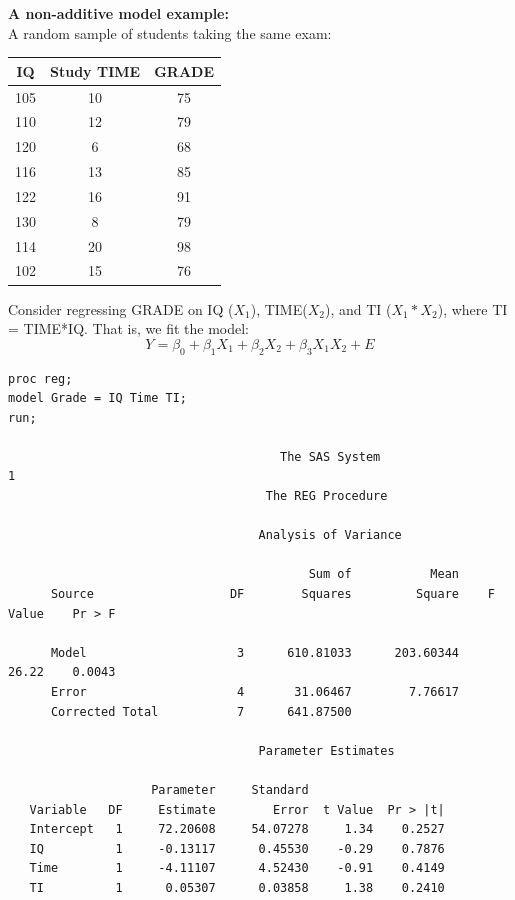 \begin{center}
\end{center}

\newpage

\textbf{A non-additive model example:}\\
A random sample of students taking the same exam:
\begin{center}
\begin{tabular}{|c|c|c|} \hline
IQ & Study TIME & GRADE \\ \hline
105 & 10 & 75 \\
110 & 12 & 79 \\
120 & 6 & 68 \\
116 & 13 & 85 \\
122 & 16 & 91 \\
130 & 8 & 79 \\
114 & 20 & 98 \\
102 & 15 & 76 \\ \hline
\end{tabular}
\end{center}

Consider regressing GRADE on IQ ($X_1$), TIME($X_2$), and TI ($X_1*X_2$), where TI = TIME*IQ.  That is, we fit the model:
$$Y=\beta_0+\beta_1X_1 +\beta_2X_2+\beta_3X_1X_2+E$$
\begin{small}
\begin{verbatim}
proc reg;
model Grade = IQ Time TI;
run;

                                      The SAS System                                     1
                                    The REG Procedure

                                   Analysis of Variance
 
                                          Sum of           Mean
      Source                   DF        Squares         Square    F Value    Pr > F

      Model                     3      610.81033      203.60344      26.22    0.0043
      Error                     4       31.06467        7.76617                   
      Corrected Total           7      641.87500                                    

                                   Parameter Estimates
 
                    Parameter     Standard
   Variable   DF     Estimate        Error  t Value  Pr > |t|
   Intercept   1     72.20608     54.07278     1.34    0.2527
   IQ          1     -0.13117      0.45530    -0.29    0.7876
   Time        1     -4.11107      4.52430    -0.91    0.4149
   TI          1      0.05307      0.03858     1.38    0.2410 
\end{verbatim}
\end{small}

